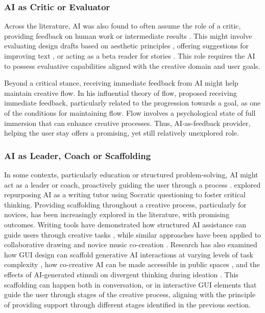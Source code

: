 \subsubsection{AI as Critic or Evaluator}
Across the literature, AI was also found to often assume the role of a critic, providing feedback on human work or intermediate results \citep{Lin2023-zq}. This might involve evaluating design drafts based on aesthetic principles \citep{Zhou2024-vp}, offering suggestions for improving text \citep{Chakrabarty2024-ov}, or acting as a beta reader for stories \citep{Ippolito2022-mf}. This role requires the AI to possess evaluative capabilities aligned with the creative domain and user goals.

Beyond a critical stance, receiving immediate feedback from AI might help maintain creative flow. In his influential theory of flow, \citet{Csikszentmihalyi1990-hu} proposed receiving immediate feedback, particularly related to the progression towards a goal, as one of the conditions for maintaining flow. Flow involves a psychological state of full immersion that can enhance creative processes. Thus, AI-as-feedback provider, helping the user stay offers a promising, yet still relatively unexplored role. 

\subsubsection{AI as Leader, Coach or Scaffolding}

In some contexts, particularly education or structured problem-solving, AI might act as a leader or coach, proactively guiding the user through a process \citep{Zhong2024-ij}. \citet{Kim2023-wt} explored repurposing AI as a writing tutor using Socratic questioning to foster critical thinking. Providing scaffolding throughout a creative process, particularly for novices, has been increasingly explored in the literature, with promising outcomes. Writing tools have demonstrated how structured AI assistance can guide users through creative tasks \citep{Yuan2022-kb, Ippolito2022-mf}, while similar approaches have been applied to collaborative drawing \citep{Fan2019-qq} and novice music co-creation \citep{Louie2020-aq}. Research has also examined how GUI design can scaffold generative AI interactions at varying levels of task complexity \citep{Ding2024-ta}, how co-creative AI can be made accessible in public spaces \citep{Long2019-lw}, and the effects of AI-generated stimuli on divergent thinking during ideation \citep{Wadinambiarachchi2024-jn}. This scaffolding can happen both in conversation, or in interactive GUI elements that guide the user through stages of the creative process, aligning with the principle of providing support through different stages identified in the previous section. 

